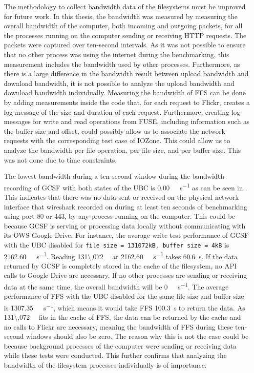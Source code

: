 The methodology to collect bandwidth data of the filesystems must be improved for future work. In this thesis, the bandwidth was measured by measuring the overall bandwidth of the computer, both incoming and outgoing packets, for all  the processes running on the computer sending or receiving HTTP requests. The packets were captured over \mbox{ten-second} intervals. As it was not possible to ensure that no other process was using the internet during the benchmarking, this measurement includes the bandwidth used by other processes. Furthermore, as there is a large difference in the bandwidth result between upload bandwidth and download bandwidth, it is not possible to analyze the upload bandwidth and download bandwidth individually. Measuring the bandwidth of \gls{FFS} can be done by adding measurements inside the code that, for each request to Flickr, creates a log message of the size and duration of each request. Furthermore, creating log messages for write and read operations from \gls{FUSE}, including information such as the buffer size and offset, could possibly allow us to associate the network requests with the corresponding test case of IOZone. This could allow us to analyze the bandwidth per file operation, per file size, and per buffer size. This was not done due to time constraints.

The lowest bandwidth during a ten-second window during the bandwidth recording of \gls{GCSF} with both states of the \gls{UBC} is \SI[per-mode = symbol]{0.00}{\kilo\byte\per\second} as can be seen in . This indicates that there was no data sent or received on the physical network interface that wireshark recorded on during at least ten seconds of benchmarking using port 80 or 443, by any process running on the computer. This could be because \gls{GCSF} is serving or processing data locally without communicating with its \gls{OWS} Google Drive. For instance, the average write test performance of \gls{GCSF} with the \gls{UBC} disabled for \texttt{file size = \num{131072}kB, buffer size = \num{4}kB} is \SI[per-mode = symbol]{2162.60}{\kilo\byte\per\second}. Reading \SI[per-mode = symbol]{131\,072}{\kilo\byte} at \SI[per-mode = symbol]{2162.60}{\kilo\byte\per\second} takes \SI[per-mode = symbol]{60.6}{\second}. If the data returned by \gls{GCSF} is completely stored in the cache of the filesystem, no \gls{API} calls to Google Drive are necessary. If no other processes are sending or receiving data at the same time, the overall bandwidth will be \SI[per-mode = symbol]{0}{\kilo\byte\per\second}. The average performance of \gls{FFS} with the \gls{UBC} disabled for the same file size and buffer size is \SI[per-mode = symbol]{1307.35}{\kilo\byte\per\second}, which means it would take \gls{FFS} \SI[per-mode = symbol]{100.3}{\second} to return the data. As \SI[per-mode = symbol]{131\,072}{\kilo\byte} fits in the cache of \gls{FFS}, the data can be returned by the cache and no calls to Flickr are necessary, meaning the bandwidth of \gls{FFS} during these ten-second windows should also be zero. The reason why this is not the case could be because background processes of the computer were sending or receiving data while these tests were conducted. This further confirms that analyzing the bandwidth of the filesystem processes individually is of importance.

